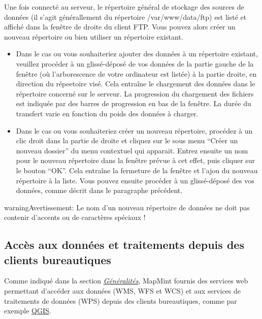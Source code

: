 \documentclass[letterpaper,10pt,french]{sphinxmanual}
\begin{document}
Une fois connecté au serveur, le répertoire général de stockage des sources de données (il s'agit générallement du répertoire /var/www/data/ftp) est listé et affiché dans la fenêtre de droite du client FTP. Vous pouvez alors créer un nouveau répertoire ou bien utiliser un répertoire existant.
\begin{itemize}
\item {} 
Dans le cas ou vous souhaiteriez ajouter des données à un répertoire existant, veuillez procéder à un glissé-déposé de vos données de la partie gauche de la fenêtre (où l'arborescence de votre ordinateur est listée) à la partie droite, en direction du répeetoire visé. Cela entraîne le chargement des données dans le répertoire concerné sur le serveur. La progression du chargement des fichiers est indiquée par des barres de progression en bas de la fenêtre. La durée du transfert varie en fonction du poids des données à charger.

\item {} 
Dans le cas ou vous souhaiteriez créer un nouveau répertoire, procédez à un clic droit dans la partie de droite et cliquez sur le sous menu ``Créer un nouveau dossier'' du menu contextuel qui apparait. Entrez ensuite un nom pour le nouveau répertoire dans la fenêtre prévue à cet effet, puis cliquer sur le bouton ``OK''. Cela entraîne la fermeture de la fenêtre et l'ajou du nouveau répertoire à la liste. Vous pouvez ensuite procéder à un glissé-déposé des vos données, comme décrit dans le paragraphe précédent.

\end{itemize}

\begin{notice}{warning}{Avertissement:}
Le nom d'un nouveau répertoire de données ne doit pas contenir d'accents ou de caractères spéciaux !
\end{notice}


\subsection{Accès aux données et traitements depuis des clients bureautiques}
\label{introduction/usemapmint:acces-aux-donnees-et-traitements-depuis-des-clients-bureautiques}
Comme indiqué dans la section {\hyperref[introduction/introduction:userguidegeneral]{\emph{Généralités}}}, MapMint fournis
des services web permettant d'accéder aux données (WMS, WFS et WCS) et
aux services de traitements de données (WPS) depuis des clients
bureautiques, comme par exemple \href{http://www.qgis.org}{QGIS}.
\end{document}
